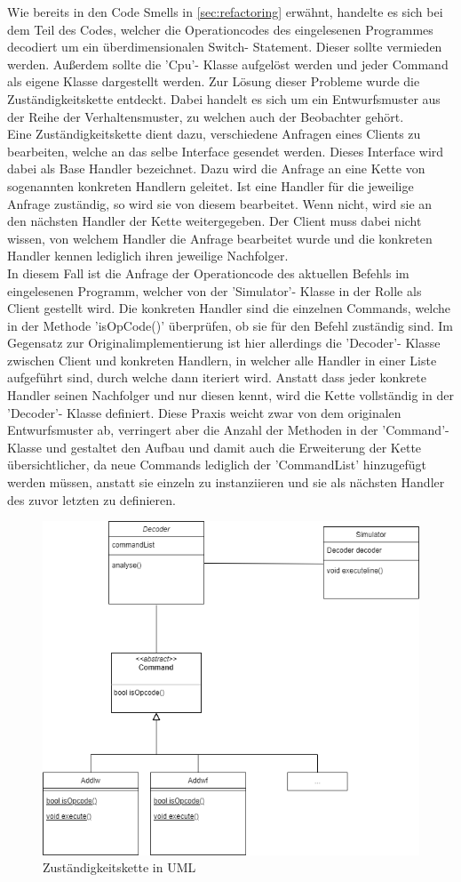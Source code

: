 \documentclass[12pt,a4paper,titlepage,ngerman,pdftex]{report}
\begin{document}
	Wie bereits in den Code Smells in \autoref{sec:refactoring} erwähnt, handelte es sich bei dem Teil des Codes, welcher die Operationcodes des eingelesenen Programmes decodiert um ein überdimensionalen Switch- Statement.
	Dieser sollte vermieden werden. Außerdem sollte die 'Cpu'- Klasse aufgelöst werden und jeder Command als eigene Klasse dargestellt werden. Zur Lösung dieser Probleme wurde die Zuständigkeitskette entdeckt.
	Dabei handelt es sich um ein Entwurfsmuster aus der Reihe der Verhaltensmuster, zu welchen auch der Beobachter gehört. 
	\\
	Eine Zuständigkeitskette dient dazu, verschiedene Anfragen eines Clients zu bearbeiten, welche an das selbe Interface gesendet werden. Dieses Interface wird dabei als Base Handler bezeichnet. Dazu wird die Anfrage an eine Kette von sogenannten konkreten Handlern geleitet.
	Ist eine Handler für die jeweilige Anfrage zuständig, so wird sie von diesem bearbeitet. Wenn nicht, wird sie an den nächsten Handler der Kette weitergegeben. Der Client muss dabei nicht wissen, von welchem Handler die Anfrage bearbeitet wurde und die konkreten Handler kennen lediglich ihren jeweilige Nachfolger.
	\\
	In diesem Fall ist die Anfrage der Operationcode des aktuellen Befehls im eingelesenen Programm, welcher von der 'Simulator'- Klasse in der Rolle als Client gestellt wird. Die konkreten Handler sind die einzelnen Commands, welche in der Methode 'isOpCode()' überprüfen, ob sie für den Befehl zuständig sind.
	Im Gegensatz zur Originalimplementierung ist hier allerdings die 'Decoder'- Klasse zwischen Client und konkreten Handlern, in welcher alle Handler in einer Liste aufgeführt sind, durch welche dann iteriert wird. Anstatt dass jeder konkrete Handler seinen Nachfolger und nur diesen kennt, wird die Kette vollständig in der 'Decoder'- Klasse definiert.
	Diese Praxis weicht zwar von dem originalen Entwurfsmuster ab, verringert aber die Anzahl der Methoden in der 'Command'-Klasse und gestaltet den Aufbau und damit auch die Erweiterung der Kette übersichtlicher, da neue Commands lediglich der 'CommandList' hinzugefügt werden müssen,
	anstatt sie einzeln zu instanziieren und sie als nächsten Handler des zuvor letzten zu definieren.
	
	\begin{figure}
		\centering
		\includegraphics[width = .7 \linewidth]{"images/zustaendigkeitskette.png"}
		\caption{Zuständigkeitskette in UML}
	\end{figure}
	
\end{document}
